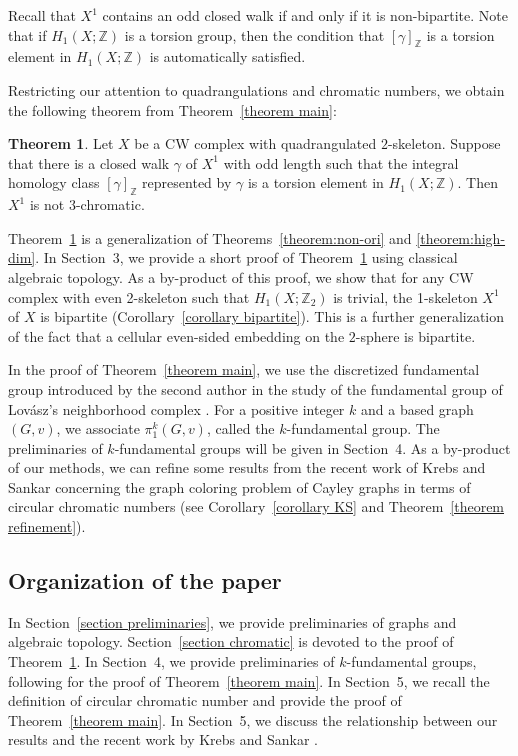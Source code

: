 \documentclass[11pt, amsfonts]{amsart}
\numberwithin{equation}{section}
\theoremstyle{definition}
\newtheorem{theoremalpha}{Theorem} %
\theoremstyle{remark}
\newcommand{\ZZ}{\mathbb{Z}}
\begin{document}
Recall that $X^1$ contains an odd closed walk if and only if it is non-bipartite. Note that if $H_1(X; \ZZ)$ is a torsion group, then the condition that $[\gamma]_{\ZZ}$ is a torsion element in $H_1(X; \ZZ)$ is automatically satisfied.

Restricting our attention to quadrangulations and chromatic numbers, we obtain the following theorem from Theorem~\ref{theorem main}:

\begin{theoremalpha} \label{theorem main 2}
Let $X$ be a CW complex with quadrangulated $2$-skeleton. Suppose that there is a closed walk $\gamma$ of $X^1$ with odd length such that the integral homology class $[\gamma]_{\ZZ}$ represented by $\gamma$ is a torsion element in $H_1(X ; \ZZ)$. Then $X^1$ is not $3$-chromatic.
\end{theoremalpha}

Theorem~\ref{theorem main 2} is a generalization of Theorems~\ref{theorem:non-ori} and \ref{theorem:high-dim}. In Section~3, we provide a short proof of Theorem~\ref{theorem main 2} using classical algebraic topology. As a by\mbox{-}product of this proof, we show that for any CW complex with even 2-skeleton such that $H_1(X; \ZZ_2)$ is trivial, the 1-skeleton $X^1$ of $X$ is bipartite (Corollary~\ref{corollary bipartite}). This is a further generalization of the fact that a cellular even-sided embedding on the $2$-sphere is bipartite.

In the proof of Theorem~\ref{theorem main}, we use the discretized fundamental group introduced by the second author \cite{MatsushitaJMSUT} in the study of the fundamental group of Lov\'asz's neighborhood complex \cite{Lovasz}. For a positive integer $k$ and a based graph $(G,v)$, we associate $\pi_1^k(G,v)$, called the $k$-fundamental group. The preliminaries of $k$-fundamental groups will be given in Section~4. As a \mbox{by-product} of our methods, we can refine some results from the recent work of Krebs and Sankar \cite{KrebsSankar} concerning the graph coloring problem of Cayley graphs in terms of circular chromatic numbers (see Corollary~\ref{corollary KS} and Theorem~\ref{theorem refinement}).


\subsection*{Organization of the paper}
In Section~\ref{section preliminaries}, we provide preliminaries of graphs and algebraic topology. Section~\ref{section chromatic} is devoted to the proof of Theorem~\ref{theorem main 2}. In Section~4, we provide preliminaries of $k$-fundamental groups, following \cite{MatsushitaJMSUT} for the proof of Theorem~\ref{theorem main}. In Section~5, we recall the definition of circular chromatic number and provide the proof of Theorem~\ref{theorem main}. In Section~5, we discuss the relationship between our results and the recent work by Krebs and Sankar \cite{KrebsSankar}.
\end{document}
